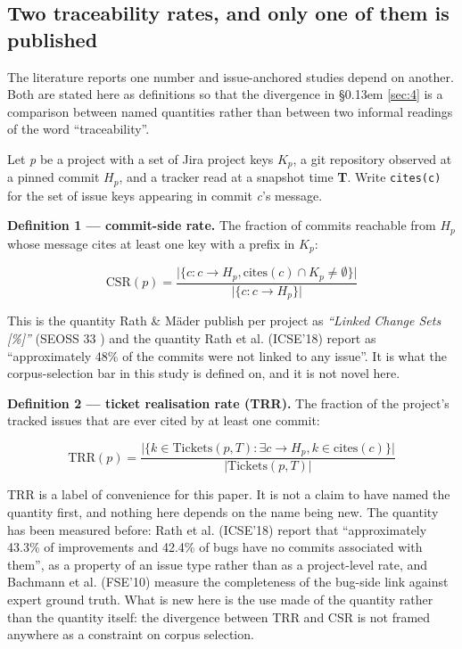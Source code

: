\documentclass[sigconf,review,anonymous]{acmart}
\begin{document}
\subsection{Two traceability rates, and only one of them is published}
\label{sec:3.1}

The literature reports one number and issue-anchored studies depend on another. Both are stated here as definitions so that the divergence in \S\kern0.13em \ref{sec:4} is a comparison between named quantities rather than between two informal readings of the word ``traceability''.

Let \emph{p} be a project with a set of Jira project keys \textbf{$K_p$}, a git repository observed at a pinned commit \textbf{$H_p$}, and a tracker read at a snapshot time \textbf{T}. Write \texttt{cites(c)} for the set of issue keys appearing in commit \emph{c}'s message.

\textbf{Definition 1 --- commit-side rate.} The fraction of commits reachable from $H_p$ whose message cites at least one key with a prefix in $K_p$:

\[\mathrm{CSR}(p) = \frac{\bigl\lvert\{ c : c \longrightarrow H_p, \mathrm{cites}(c) \cap K_p \neq \emptyset \}\bigr\rvert}{\bigl\lvert\{ c : c \longrightarrow H_p \}\bigr\rvert}\]

This is the quantity Rath \& M\"ader publish per project as \emph{``Linked Change Sets [\%]''} (SEOSS 33 \cite{rath2019seoss}) and the quantity Rath et al. (ICSE'18) \cite{rath2018traceability} report as ``approximately 48\% of the commits were not linked to any issue''. It is what the corpus-selection bar in this study is defined on, and it is not novel here.

\textbf{Definition 2 --- ticket realisation rate (TRR).} The fraction of the project's tracked issues that are ever cited by at least one commit:

\[\mathrm{TRR}(p) = \frac{\bigl\lvert\{ k \in \mathrm{Tickets}(p, T) : \exists c \longrightarrow H_p, k \in \mathrm{cites}(c) \}\bigr\rvert}{\lvert \mathrm{Tickets}(p, T)\rvert}\]

TRR is a label of convenience for this paper. It is not a claim to have named the quantity first, and nothing here depends on the name being new. The quantity has been measured before: Rath et al. (ICSE'18) \cite{rath2018traceability} report that ``approximately 43.3\% of improvements and 42.4\% of bugs have no commits associated with them'', as a property of an issue type rather than as a project-level rate, and Bachmann et al. (FSE'10) \cite{bachmann2010missing} measure the completeness of the bug-side link against expert ground truth. What is new here is the use made of the quantity rather than the quantity itself: the divergence between TRR and CSR is not framed anywhere as a constraint on corpus selection.
\end{document}
